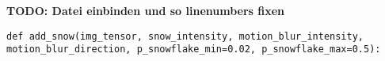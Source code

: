 \textbf{TODO: Datei einbinden und so linenumbers fixen}
\begin{code}
\label{code:snow-delcaration}
\begin{verbatim}
def add_snow(img_tensor, snow_intensity, motion_blur_intensity, motion_blur_direction, p_snowflake_min=0.02, p_snowflake_max=0.5):
\end{verbatim}
\end{code}
